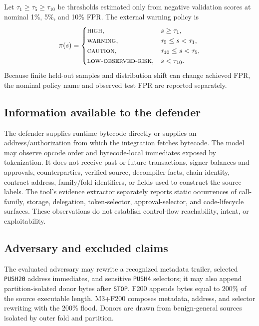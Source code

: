 \documentclass[conference]{IEEEtran}
\newcommand{\code}[1]{\texttt{#1}}
\begin{document}
Let $\tau_{1}\geq\tau_{5}\geq\tau_{10}$ be thresholds estimated only from negative validation
scores at nominal 1\%, 5\%, and 10\% FPR. The external warning policy is
\begin{equation}
  \pi(s)=
  \begin{cases}
    \textsc{high}, & s\geq\tau_1,\\
    \textsc{warning}, & \tau_5\leq s<\tau_1,\\
    \textsc{caution}, & \tau_{10}\leq s<\tau_5,\\
    \textsc{low-observed-risk}, & s<\tau_{10}.
  \end{cases}
  \label{eq:policy}
\end{equation}
Because finite held-out samples and distribution shift can change achieved FPR, the nominal policy
name and observed test FPR are reported separately.

\subsection{Information available to the defender}

The defender supplies runtime bytecode directly or supplies an address/authorization from which
the integration fetches bytecode. The model may observe opcode order and bytecode-local
immediates exposed by tokenization. It does not receive past or future transactions, signer
balances and approvals, counterparties, verified source, decompiler facts, chain identity,
contract address, family/fold identifiers, or fields used to construct the source labels. The
tool's evidence extractor separately reports static occurrences of call-family, storage,
delegation, token-selector, approval-selector, and code-lifecycle surfaces. These observations do
not establish control-flow reachability, intent, or exploitability.

\subsection{Adversary and excluded claims}

The evaluated adversary may rewrite a recognized metadata trailer, selected \code{PUSH20} address
immediates, and sensitive \code{PUSH4} selectors; it may also append partition-isolated donor
bytes after \code{STOP}. F200 appends bytes equal to 200\% of the source executable length.
M3+F200 composes metadata, address, and selector rewriting with the 200\% flood. Donors are drawn
from benign-general sources isolated by outer fold and partition.
\end{document}
